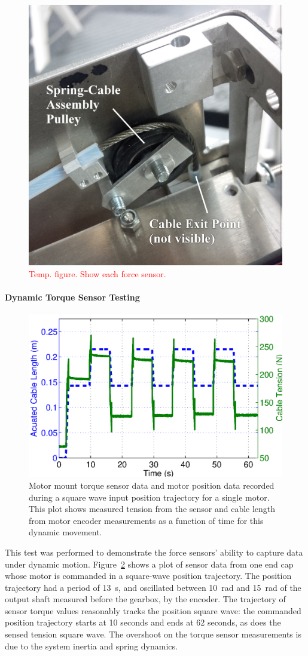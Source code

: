\begin{appendices}
\begin{figure}[thpb]
      \centering
      \includegraphics[width=0.6\columnwidth]{tex/img/cable_pulley_bearing_labelled_fixedfonts}
      \caption{\textcolor{red}{Temp. figure. Show each force sensor.}}
      \label{fig:force_sensors}
\end{figure}

\paragraph{Dynamic Torque Sensor Testing}
\begin{figure}[thpb]
      \centering
      \includegraphics[width=0.8\columnwidth]{tex/img/ICRA2015_dynamic_sensor_test}
      \caption{Motor mount torque sensor data and motor position data recorded during a square wave input position trajectory for a single motor. This plot shows measured tension from the sensor and cable length from motor encoder measurements as a function of time for this dynamic movement.}
      \label{fig:sensor1data}
\end{figure}

This test was performed to demonstrate the force sensors' ability to capture data under dynamic motion.
Figure~\ref{fig:sensor1data} shows a plot of sensor data from one end cap whose motor is commanded in a square-wave position trajectory.
The position trajectory had a period of \SI{13}{\second}, and oscillated between \SI{10}{\radian} and \SI{15}{\radian} of the output shaft measured before the gearbox, by the encoder.
The trajectory of sensor torque values reasonably tracks the position square wave: the commanded position trajectory starts at 10 seconds and ends at 62 seconds, as does the sensed tension square wave.
The overshoot on the torque sensor measurements is due to the system inertia and spring dynamics.


\end{appendices}

